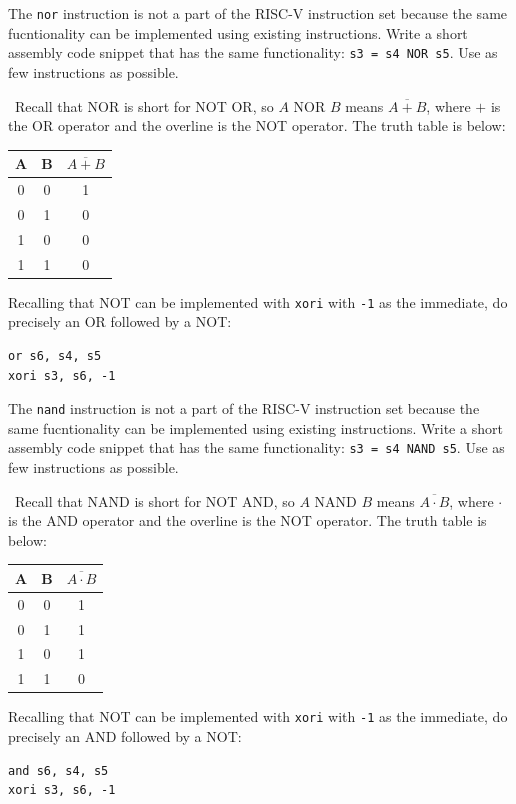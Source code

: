 \documentclass[12pt]{article}
\newenvironment{ex}[2][Exercise]{\begin{trivlist}
		\item[\hskip \labelsep {\bfseries #1}\hskip \labelsep {\bfseries #2.}]}{\end{trivlist}}
\newenvironment{sol}[1][Solution]{\begin{trivlist}
		\item[\hskip \labelsep {\bfseries #1:}]}{\end{trivlist}}
\begin{document}
\begin{ex}{6.7}
	The \texttt{nor} instruction is not a part of the RISC-V instruction set because the same
	fucntionality can be implemented using existing instructions. Write a short assembly
	code snippet that has the same functionality: \texttt{s3 = s4 NOR s5}. Use as few instructions
	as possible.
\end{ex}

\begin{sol}
	\
	Recall that NOR is short for NOT OR, so $A$ NOR $B$ means $\overline{A+B}$, where $+$ is the
	OR operator and the overline is the NOT operator. The truth table is below:
	\begin{center}
		\begin{tabular}{cc|c}
			A & B & $\overline{A+B}$\\
			\hline
			0 & 0 & 1\\
			0 & 1 & 0\\
			1 & 0 & 0\\
			1 & 1 & 0
		\end{tabular}
	\end{center}
	Recalling that NOT can be implemented with \texttt{xori} with \texttt{-1} as the immediate,
	do precisely an OR followed by a NOT:
	\begin{lstlisting}[language={}]
or s6, s4, s5
xori s3, s6, -1
	\end{lstlisting}
\end{sol}

\begin{ex}{6.8}
	The \texttt{nand} instruction is not a part of the RISC-V instruction set because the same
	fucntionality can be implemented using existing instructions. Write a short assembly
	code snippet that has the same functionality: \texttt{s3 = s4 NAND s5}. Use as few instructions
	as possible.
\end{ex}

\begin{sol}
	\
	Recall that NAND is short for NOT AND, so $A$ NAND $B$ means $\overline{A\cdot B}$, where $\cdot$ is the
	AND operator and the overline is the NOT operator. The truth table is below:
	\begin{center}
		\begin{tabular}{cc|c}
			A & B & $\overline{A\cdot B}$\\
			\hline
			0 & 0 & 1\\
			0 & 1 & 1\\
			1 & 0 & 1\\
			1 & 1 & 0
		\end{tabular}
	\end{center}
	Recalling that NOT can be implemented with \texttt{xori} with \texttt{-1} as the immediate,
	do precisely an AND followed by a NOT:
	\begin{lstlisting}[language={}]
and s6, s4, s5
xori s3, s6, -1
	\end{lstlisting}
\end{sol}
\end{document}
